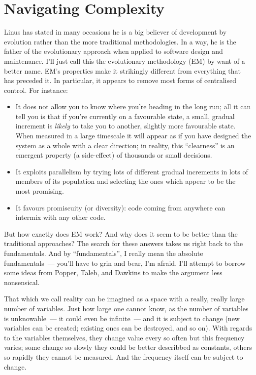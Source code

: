 \documentclass{memoir}
\begin{document}
\section{Navigating Complexity}

Linus has stated in many occasions he is a big believer of development
by evolution rather than the more traditional methodologies. In a way,
he is the father of the evolutionary approach when applied to software
design and maintenance. I'll just call this the evolutionary
methodology (EM) by want of a better name. EM's properties make it
strikingly different from everything that has preceded it. In
particular, it appears to remove most forms of centralised
control. For instance:

\begin{itemize}
\item It does not allow you to know where you're heading in the long
  run; all it can tell you is that if you're currently on a favourable
  state, a small, gradual increment is \emph{likely} to take you to
  another, slightly more favourable state. When measured in a large
  timescale it will appear as if you have designed the system as a
  whole with a clear direction; in reality, this ``clearness'' is an
  emergent property (a side-effect) of thousands or small decisions.
\item It exploits parallelism by trying lots of different gradual
  increments in lots of members of its population and selecting the
  ones which appear to be the most promising.
\item It favours promiscuity (or diversity): code coming from anywhere
  can intermix with any other code.
\end{itemize}

But how exactly does EM work? And why does it seem to be better than
the traditional approaches? The search for these answers takes us
right back to the fundamentals. And by ``fundamentals'', I really mean
the absolute fundamentals~--- you'll have to grin and bear, I'm
afraid. I'll attempt to borrow some ideas from Popper, Taleb, and
Dawkins to make the argument less nonsensical.

That which we call reality can be imagined as a space with a really,
really large number of variables. Just how large one cannot know, as
the number of variables is unknowable~--- it could even be infinite~---
and it is subject to change (new variables can be created; existing
ones can be destroyed, and so on). With regards to the variables
themselves, they change value every so often but this frequency
varies; some change so slowly they could be better describbed as
constants, others so rapidly they cannot be measured. And the
frequency itself can be subject to change.
\end{document}
